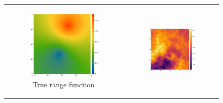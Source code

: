 \documentclass{article}
\numberwithin{equation}{section}
\begin{document}
\begin{figure}[H]
  \centering
  \begin{tabular}{cc}
    \begin{subfigure}[t]{0.3\textwidth}
      \includegraphics[width=\textwidth]{figures/isotropic/tru-nsr-p10000.pdf}
      \caption{True range function}
    \end{subfigure}
    & \begin{subfigure}[t]{0.3\textwidth}
      \includegraphics[width=\textwidth]{figures/isotropic/dat-nsr-p10000.pdf}

\end{subfigure}
\end{tabular}
\end{figure}
\end{document}

